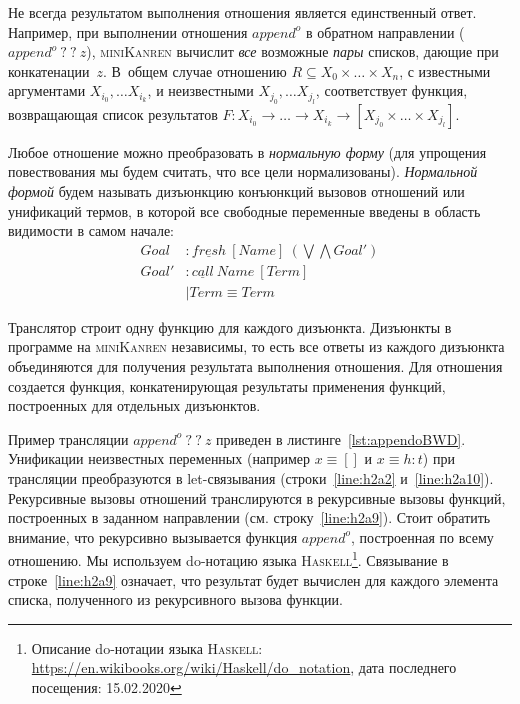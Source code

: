 \documentclass[conference,a4paper,american,russian]{IEEEtran}
\newcommand{\miniKanren}{\textsc{miniKanren}}
\newcommand{\haskell}{\textsc{Haskell}}
\begin{document}
Не всегда результатом выполнения отношения является единственный ответ.
Например, при выполнении отношения $append^o$ в обратном направлении ($append^o \ ? \ ? \ z$), \miniKanren{} вычислит \emph{все} возможные \emph{пары} списков, дающие при конкатенации~$z$. 
В~общем случае отношению $R \subseteq X_0 \times \dots \times X_n$, с известными аргументами $X_{i_0}, \dots X_{i_k}$, и неизвестными $X_{j_0}, \dots X_{j_l}$, соответствует функция, возвращающая список результатов $F : X_{i_0} \to \dots \to X_{i_k} \to [X_{j_0} \times \dots \times X_{j_l}]$. 

Любое отношение можно преобразовать в \emph{нормальную форму} (для упрощения повествования мы будем считать, что все цели нормализованы). 
\emph{Нормальной формой} будем называть дизъюнкцию конъюнкций вызовов отношений или унификаций термов, в которой все свободные переменные введены в область видимости в самом начале:
\begin{align*}
  Goal  &: \underline{fresh} \ [Name] \ (\bigvee \bigwedge Goal') \\
  Goal' &: \underline{call} \ Name \ [Term] \\
        &\mid Term \equiv Term 
\end{align*}

Транслятор строит одну функцию для каждого дизъюнкта. 
Дизъюнкты в программе на \miniKanren{} независимы, то есть все ответы из каждого дизъюнкта объединяются для получения результата выполнения отношения. 
Для отношения создается функция, конкатенирующая результаты применения функций, построенных для отдельных дизъюнктов. 

Пример трансляции $append^o \ ? \ ? \ z$ приведен в листинге~\ref{lst:appendoBWD}.  
Унификации неизвестных переменных (например $x \equiv []$ и $x \equiv h : t$) при трансляции преобразуются в let-связывания (строки~\ref{line:h2a2} и~\ref{line:h2a10}). 
Рекурсивные вызовы отношений транслируются в рекурсивные вызовы функций, построенных в заданном направлении (см. строку~\ref{line:h2a9}).
Стоит обратить внимание, что рекурсивно вызывается функция $append^o$, построенная по всему отношению.
Мы используем do-нотацию языка \haskell{}\footnote{Описание do-нотации языка \haskell{}: \url{https://en.wikibooks.org/wiki/Haskell/do\_notation}, дата последнего посещения: 15.02.2020}.
Связывание в строке~\ref{line:h2a9} означает, что результат будет вычислен для каждого элемента списка, полученного из рекурсивного вызова функции.
\end{document}
